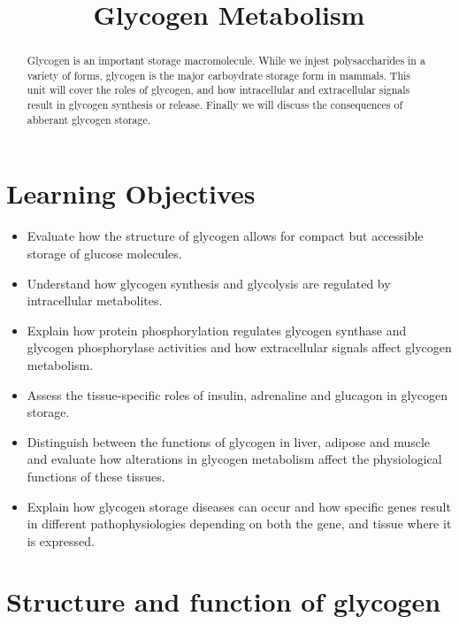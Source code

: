 \documentclass{tufte-handout}
\title{Glycogen Metabolism}
\author{}
\date{}  %
\begin{document}
\maketitle%

\begin{abstract}
\noindent Glycogen is an important storage macromolecule.  While we injest polysaccharides in a variety of forms, glycogen is the major carboydrate storage form in mammals.  This unit will cover the roles of glycogen, and how intracellular and extracellular signals result in glycogen synthesis or release.  Finally we will discuss the consequences of abberant glycogen storage.
\end{abstract}

\tableofcontents
\pagebreak
\section{Learning Objectives}

\begin{itemize}
\item Evaluate how the structure of glycogen allows for compact but accessible storage of glucose molecules.
\item Understand how glycogen synthesis and glycolysis are regulated by intracellular metabolites.
\item Explain how protein phosphorylation regulates glycogen synthase and glycogen phosphorylase activities and how extracellular signals affect glycogen metabolism.
\item Assess the tissue-specific roles of insulin, adrenaline and glucagon in glycogen storage.
\item Distinguish between the functions of glycogen in liver, adipose and muscle and evaluate how alterations in glycogen metabolism affect the physiological functions of these tissues.
\item Explain how glycogen storage diseases can occur and how specific genes result in different pathophysiologies depending on both the gene, and tissue where it is expressed.




\end{itemize}

\section{Structure and function of glycogen}
\end{document}
